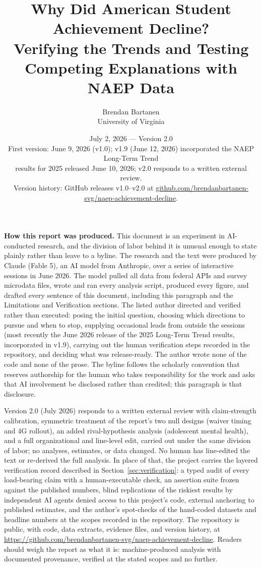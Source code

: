 \documentclass[11pt]{article}
\title{Why Did American Student Achievement Decline?\\[4pt]
\large Verifying the Trends and Testing Competing Explanations with NAEP Data}
\author{Brendan Bartanen\\[2pt]
{\normalsize University of Virginia}}
\date{{\normalsize July 2, 2026 --- Version 2.0\\[1pt]
{\small First version: June 9, 2026 (v1.0); v1.9 (June 12, 2026) incorporated the NAEP Long-Term Trend\\ results for 2025 released June 10, 2026; v2.0 responds to a written external review.\\ Version history: GitHub releases v1.0--v2.0 at \url{github.com/brendanbartanen-svg/naep-achievement-decline}.}}}
\begin{document}
\maketitle

\begin{center}
\begin{minipage}{0.94\textwidth}
\small\noindent\textbf{How this report was produced.} This document is an experiment in AI-conducted research, and the division of labor behind it is unusual enough to state plainly rather than leave to a byline. The research and the text were produced by Claude (Fable 5), an AI model from Anthropic, over a series of interactive sessions in June 2026. The model pulled all data from federal APIs and survey microdata files, wrote and ran every analysis script, produced every figure, and drafted every sentence of this document, including this paragraph and the Limitations and Verification sections. The listed author directed and verified rather than executed: posing the initial question, choosing which directions to pursue and when to stop, supplying occasional leads from outside the sessions (most recently the June 2026 release of the 2025 Long-Term Trend results, incorporated in v1.9), carrying out the human verification steps recorded in the repository, and deciding what was release-ready. The author wrote none of the code and none of the prose. The byline follows the scholarly convention that reserves authorship for the human who takes responsibility for the work and asks that AI involvement be disclosed rather than credited; this paragraph is that disclosure.\par\medskip\noindent Version 2.0 (July 2026) responds to a written external review with claim-strength calibration, symmetric treatment of the report's two null designs (waiver timing and 4G rollout), an added rival-hypothesis analysis (adolescent mental health), and a full organizational and line-level edit, carried out under the same division of labor; no analyses, estimates, or data changed. No human has line-edited the text or re-derived the full analysis. In place of that, the project carries the layered verification record described in Section~\ref{sec:verification}: a typed audit of every load-bearing claim with a human-executable check, an assertion suite frozen against the published numbers, blind replications of the riskiest results by independent AI agents denied access to this project's code, external anchoring to published estimates, and the author's spot-checks of the hand-coded datasets and headline numbers at the scopes recorded in the repository. The repository is public, with code, data extracts, evidence files, and version history, at \url{https://github.com/brendanbartanen-svg/naep-achievement-decline}. Readers should weigh the report as what it is: machine-produced analysis with documented provenance, verified at the stated scopes and no further.
\end{minipage}
\end{center}
\vspace{2pt}
\end{document}
